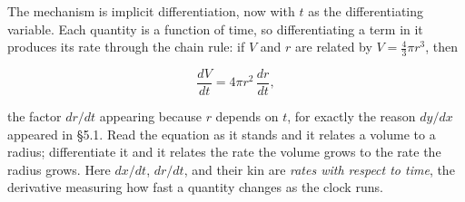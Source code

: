 \documentclass[a4paper,12pt,oneside]{memoir}
\begin{document}
The mechanism is implicit differentiation, now with \(t\) as the differentiating variable. Each quantity is a function of time, so differentiating a term in it produces its rate through the chain rule: if \(V\) and \(r\) are related by \(V = \tfrac{4}{3}\pi r^{3}\), then

\[ \frac{dV}{dt} = 4\pi r^{2}\,\frac{dr}{dt}, \]

the factor \(dr/dt\) appearing because \(r\) depends on \(t\), for exactly the reason \(dy/dx\) appeared in §5.1. Read the equation as it stands and it relates a volume to a radius; differentiate it and it relates the rate the volume grows to the rate the radius grows. Here \(dx/dt\), \(dr/dt\), and their kin are \emph{rates with respect to time}, the derivative measuring how fast a quantity changes as the clock runs.
\end{document}
